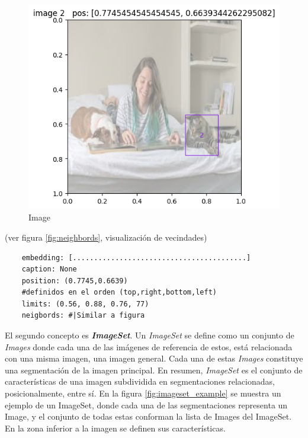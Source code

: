 \begin{figure}[H]
    \centering
    \includegraphics[height=0.3\textheight]{Graphics/ImageExample.png}
    \caption{Image}
    \label{fig:imageexample}
\end{figure}

(ver figura \ref{fig:neighbords}, visualizaci\'on de vecindades)
\begin{verbatim}
    embedding: [.........................................]    
    caption: None    
    position: (0.7745,0.6639)
    #definidos en el orden (top,right,bottom,left)
    limits: (0.56, 0.88, 0.76, 77)
    neigbords: #|Similar a figura
\end{verbatim}


El segundo concepto es \textbf{\textit{ImageSet}}. Un \textit{ImageSet} se define como un conjunto de \textit{Images} donde cada una de las imágenes de referencia de estos, está relacionada con una misma imagen, una imagen general. Cada una de estas \textit{Images} constituye una segmentación de la imagen principal. En resumen, \textit{ImageSet} es el conjunto de características de una imagen subdividida en segmentaciones relacionadas, posicionalmente, entre s\'i. En la figura \ref{fig:imageset_example} se muestra un ejemplo de un ImageSet, donde cada una de las segmentaciones representa un Image, y el conjunto de todas estas conforman la lista de Images del ImageSet. En la zona inferior a la imagen se definen sus caracter\'isticas.

